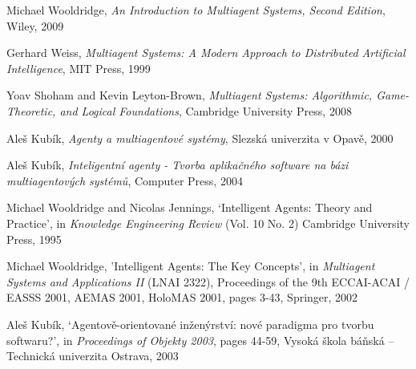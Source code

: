 
\begin{thebibliography}{99}


Michael Wooldridge,
\textit{An Introduction to Multiagent Systems, Second Edition},
Wiley, 2009

Gerhard Weiss,
\textit{Multiagent Systems: A Modern Approach to Distributed Artificial Intelligence},
MIT Press, 1999

Yoav Shoham and Kevin Leyton-Brown,
\textit{Multiagent Systems: Algorithmic, Game-Theoretic, and Logical Foundations},
Cambridge University Press, 2008

Aleš Kubík,
\textit{Agenty a multiagentové systémy},
Slezská univerzita v Opavě, 2000

Aleš Kubík,
\textit{Inteligentní agenty - Tvorba aplikačného software na bázi multiagentových systémů},
Computer Press, 2004

Michael Wooldridge and Nicolas Jennings,
`Intelligent Agents: Theory and Practice',
in \textit{Knowledge Engineering Review} (Vol. 10 No. 2)
Cambridge University Press, 1995

Michael Wooldridge,
'Intelligent Agents: The Key Concepts',
in \textit{Multiagent Systems and Applications II} (LNAI 2322),
Proceedings of the 9th ECCAI-ACAI / EASSS 2001, AEMAS 2001, HoloMAS 2001,
pages 3-43,
Springer, 2002 

Aleš Kubík,
`Agentově-orientované inženýrství: nové paradigma pro tvorbu softwaru?',
in \textit{Proceedings of Objekty 2003},
pages 44-59,
Vysoká škola báňská – Technická univerzita Ostrava, 2003


\end{thebibliography}
